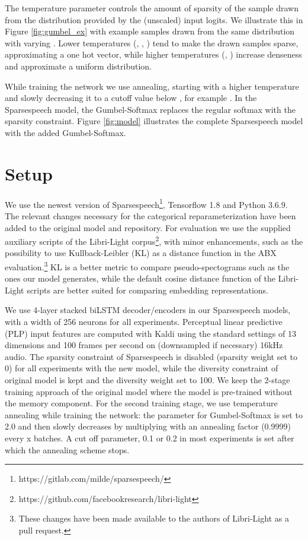 \documentclass[a4paper]{article}
\begin{document}
The temperature parameter  controls the amount of sparsity of the sample drawn from the distribution provided by the (unscaled) input logits. We illustrate this in Figure \ref{fig:gumbel_ex} with example samples drawn from the same distribution with varying . Lower temperatures (, , ) tend to make the drawn samples sparse, approximating a one hot vector, while higher temperatures (, ) increase denseness and approximate a uniform distribution. 

While training the network we use annealing, starting with a higher temperature and slowly decreasing it to a cutoff value below , for example . In the Sparsespeech model, the Gumbel-Softmax replaces the regular softmax with the sparsity constraint. Figure \ref{fig:model} illustrates the complete Sparsespeech model with the added Gumbel-Softmax.

\section{Setup}

We use the newest version of Sparsespeech\footnote{https://gitlab.com/milde/sparsespeech/}, Tensorflow 1.8 and Python 3.6.9. The relevant changes necessary for the categorical reparameterization have been added to the original model and repository.
For evaluation we use the supplied auxiliary scripts of the Libri-Light corpus\footnote{https://github.com/facebookresearch/libri-light}, with minor enhancements, such as the possibility to use Kullback-Leibler (KL) \cite{kullback1951information} as a distance function in the ABX evaluation.\footnote{These changes have been made available to the authors of Libri-Light as a pull request.} KL is a better metric to compare pseudo-spectograms such as the ones our model generates, while the default cosine distance function of the Libri-Light scripts are better suited for comparing embedding representations.

We use 4-layer stacked biLSTM decoder/encoders in our Sparsespeech models, with a width of 256 neurons for all experiments. Perceptual linear predictive (PLP) \cite{hermansky1990perceptual} input features are computed with Kaldi \cite{povey2011kaldi} using the standard settings of 13 dimensions and 100 frames per second on (downsampled if necessary) 16kHz audio. The sparsity constraint of Sparsespeech is disabled (sparsity weight set to 0) for all experiments with the new model, while the diversity constraint of original model is kept and the diversity weight set to 100. We keep the 2-stage training approach of the original model where the model is pre-trained without the memory component. For the second training stage, we use temperature annealing while training the network: the  parameter for Gumbel-Softmax is set to 2.0 and then slowly decreases by multiplying with an annealing factor (0.9999) every x batches. A cut off parameter, 0.1 or 0.2 in most experiments is set after which the annealing scheme stops.
\end{document}
